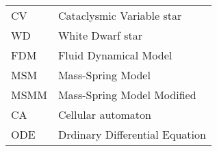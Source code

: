\vspace{1cm}

\begin{center}
\def\arraystretch{1.5}%
\setlength\tabcolsep{1cm}
\begin{tabular}{ll}

CV			& Cataclysmic Variable star \\
WD			& White Dwarf star \\
FDM			& Fluid Dynamical Model \\
MSM			& Mass-Spring Model \\
MSMM			& Mass-Spring Model Modified \\
CA			& Cellular automaton \\
ODE			& Drdinary Differential Equation

\end{tabular}
\end{center}
